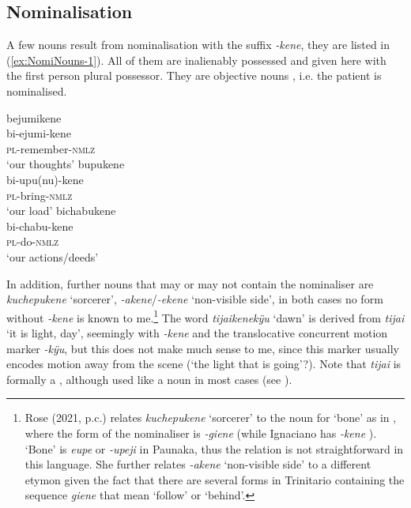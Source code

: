 \subsection{Nominalisation}\label{sec:MorphologyNominalisation}

A few nouns result from nominalisation with the suffix \textit{-kene}, they are listed in (\ref{ex:NomiNouns-1}). All of them are inalienably possessed and given here with the first person plural possessor. They are objective nouns \citep[cf.][]{ComrieThompson2007}, i.e. the patient is nominalised.


\ea\label{ex:NomiNouns-1}
  \ea\label{ex:NomiNouns-1.1}
\begingl
\glpreamble bejumikene\\
\gla bi-ejumi-kene\\
\textsc{pl}-remember-\textsc{nmlz}\\
\glft ‘our thoughts’
\endgl
  \ex\label{ex:NomiNouns-1.2}
\begingl
\glpreamble bupukene\\
\gla bi-upu(nu)-kene\\
\textsc{pl}-bring-\textsc{nmlz}\\
\glft ‘our load’
\endgl
  \ex\label{ex:NomiNouns-1.3}
\begingl
\glpreamble bichabukene\\
\gla bi-chabu-kene\\
\textsc{pl}-do-\textsc{nmlz}\\
\glft ‘our actions/deeds’
\endgl
\z
\xe

In addition, further nouns that may or may not contain the nominaliser are \textit{kuchepukene} ‘sorcerer’, \textit{-akene}/\textit{-ekene} ‘non-visible side’, in both cases no form without \textit{-kene} is known to me.\footnote{Rose (2021, p.c.) relates \textit{kuchepukene} ‘sorcerer’ to the noun for ‘bone’ as in , where the form of the nominaliser is \textit{-giene} (while Ignaciano has \textit{-kene} \citep[cf.][663--672]{OlzaZubiri2004}). ‘Bone’ is \textit{eupe} or \textit{-upeji} in Paunaka, thus the relation is not straightforward in this language. She further relates \textit{-akene} ‘non-visible side’ to a different etymon given the fact that there are several forms in Trinitario containing the sequence \textit{giene} that mean ‘follow’ or ‘behind’.} The word \textit{tijaikenekÿu} ‘dawn’ is derived from \textit{tijai} ‘it is light, day’, seemingly with \textit{-kene} and the translocative concurrent motion marker \textit{-kÿu}, but this does not make much sense to me, since this marker usually encodes motion away from the scene (‘the light that is going’?). Note that \textit{tijai} is formally a , although used like a noun in most cases (see ).

